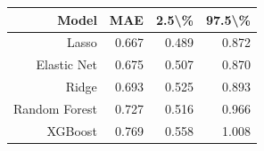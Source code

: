 \begin{tabular}{@{}rrrr@{}}
\toprule
Model & MAE & 2.5\textbackslash \% & 97.5\textbackslash \% \\
\midrule
Lasso & 0.667 & 0.489 & 0.872 \\
Elastic Net & 0.675 & 0.507 & 0.870 \\
Ridge & 0.693 & 0.525 & 0.893 \\
Random Forest & 0.727 & 0.516 & 0.966 \\
XGBoost & 0.769 & 0.558 & 1.008 \\
\bottomrule
\end{tabular}

